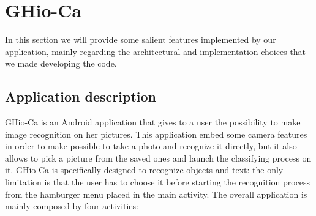 \section{GHio-Ca}
\label{sec:ghioca}
In this section we will provide some salient features implemented by our 
application, mainly regarding the architectural and implementation choices that 
we made developing the code.

\subsection{Application description}
GHio-Ca is an Android
application that gives to a user the possibility to make image recognition on
her pictures. This application embed some camera features in order to make
possible to take a photo and recognize it directly, but it also allows to pick
a picture from the saved ones and launch the classifying process on it.
GHio-Ca is specifically designed to recognize objects and text: the only
limitation is that the user has to choose it before starting the
recognition process from the hamburger menu placed in the main activity.
The overall application is mainly composed by four activities:
